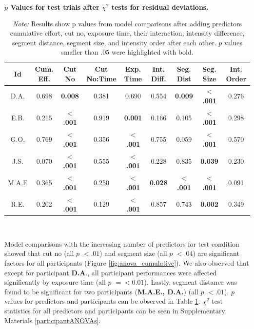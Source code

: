 \documentclass{article}
\begin{document}
\setlength{\tabcolsep}{3pt}
\renewcommand{\arraystretch}{0.6} %
\begin{table}[!h]
    \hspace*{-1.6cm} 
    \caption{\textbf{$p$ Values for test trials after $\chi^2$ tests for residual deviations.} }
    \label{table:test_p_vals}    
    \resizebox{\textwidth}{!}
    {
    \begin{tabular}{c|c c c c c c c c}
    \hline
    Id &  Cum. Eff. & Cut No &  Cut No:Time & Exp. Time &  Int. Diff. &  Seg. Dist & Seg. Size &  Int. Order \\    
    \hline
    D.A.  &         0.698 &   \textbf{0.008} &        0.381 &      0.690 &       0.554 &      \textbf{0.009} &      \textbf{$<$.001} &     0.276 \\
    E.B.  &         0.215 &   \textbf{$<$.001} &        0.919 &      \textbf{0.001} &       0.166 &      0.105 &      \textbf{$<$.001} &     0.298 \\
    G.O.  &         0.769 &   \textbf{$<$.001} &        0.356 &      \textbf{$<$.001} &       0.755 &      0.059 &      \textbf{$<$.001} &     0.570 \\
    J.S.  &         0.070 &   \textbf{$<$.001} &        0.555 &      \textbf{$<$.001}&       0.228 &      0.835 &      \textbf{0.039} &     0.230 \\
    M.A.E &         0.365 &   \textbf{$<$.001} &        0.250 &      \textbf{$<$.001} &       \textbf{0.028} &      \textbf{$<$.001} &      \textbf{$<$.001} &     0.091 \\
    R.E.  &         0.202 &   \textbf{$<$.001} &        0.129 &      \textbf{$<$.001} &       0.857 &      0.743 &      \textbf{0.002} &     0.349 \\
    \hline
    \end{tabular}} \\   
    \captionsetup{labelformat=empty}
    \caption*{\textit{Note:} Results show p values from model comparisons after adding predictors cumulative effort, cut no, exposure time, their interaction, intensity difference, segment distance, segment size, and intensity order after each other. $p$ values smaller than $.05$ were highlighted with bold.}
\end{table}


Model comparisons with the increasing number of predictors for test condition showed that cut no (all $p$ $< .01$) and segment size (all $p$ $< .04$) are significant factors for all participants (Figure \ref{fig:anova_cumulative}). We also observed that except for participant \textbf{D.A}., all participant performances were affected significantly by exposure time (all $p$ $ =< 0.01$). Lastly, segment distance was found to be significant for two participants (\textbf{M.A.E., D.A.}) (all $p$ $<.01$). $p$ values for predictors and participants can be observed in Table  \ref{table:test_p_vals}. $\chi^{2}$ test statistics for all predictors and participants can be seen in Supplementary Materials \ref{participantANOVAs}.
\end{document}
